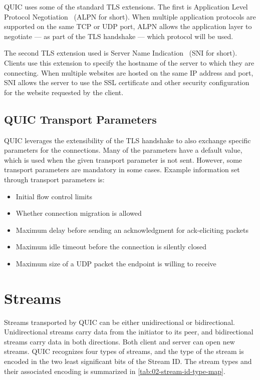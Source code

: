 QUIC uses some of the standard TLS extensions. The first is Application Level Protocol
Negotiation~\cite{rfc7301} (ALPN for short). When multiple application protocols are supported on
the same TCP or UDP port, ALPN allows the application layer to negotiate --- as part of the TLS
handshake --- which protocol will be used.

The second TLS extension used is Server Name Indication~\cite{rfc6066} (SNI for short). Clients use
this extension to specify the hostname of the server to which they are connecting. When multiple
websites are hosted on the same IP address and port, SNI allows the server to use the SSL
certificate and other security configuration for the website requested by the client.

\subsection{QUIC Transport Parameters}

QUIC leverages the extensibility of the TLS handshake to also exchange specific parameters for the
connections. Many of the parameters have a default value, which is used when the given transport
parameter is not sent. However, some transport parameters are mandatory in some cases. Example
information set through transport parameters is:

\begin{itemize}

  \item Initial flow control limits

  \item Whether connection migration is allowed

  \item Maximum delay before sending an acknowledgment for ack-eliciting packets

  \item Maximum idle timeout before the connection is silently closed

  \item Maximum size of a UDP packet the endpoint is willing to receive

\end{itemize}

\section{Streams}

Streams transported by QUIC can be either unidirectional or bidirectional. Unidirectional streams
carry data from the initiator to its peer, and bidirectional streams carry data in both directions.
Both client and server can open new streams. QUIC recognizes four types of streams, and the type of
the stream is encoded in the two least significant bits of the Stream ID. The stream types and their
associated encoding is summarized in \autoref{tab:02-stream-id-type-map}.

